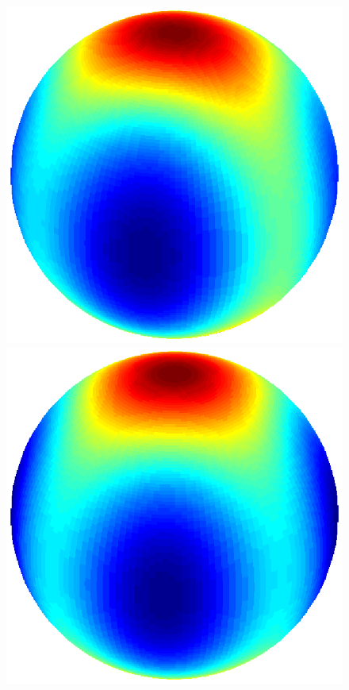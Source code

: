 \documentclass[dvips,aoas,preprint]{imsart}
\numberwithin{equation}{section}
\theoremstyle{plain}
\begin{document}
\begin{figure}[!htbp]
\begin{minipage}[]{0.12\textwidth}
    \end{minipage}
    \begin{minipage}[]{0.12\textwidth}
      \centering
      \includegraphics*[width=\textwidth]{figure2j1.eps}
    \end{minipage}  
    \begin{minipage}[]{0.12\textwidth}
      \centering
      \includegraphics*[width=\textwidth]{figure2k1.eps}

\end{minipage}
\end{figure}
\end{document}
